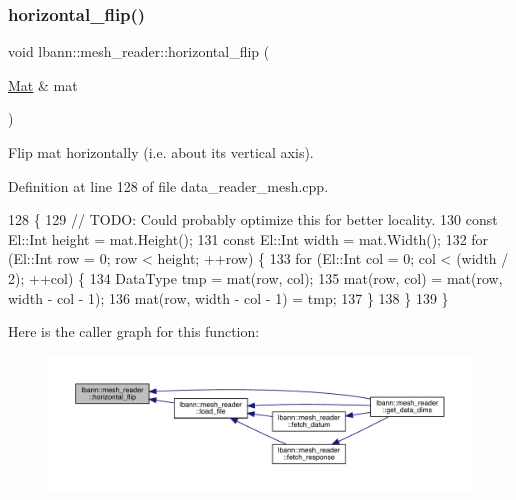 \subsubsection{\texorpdfstring{horizontal\+\_\+flip()}{horizontal\_flip()}}
{\footnotesize\ttfamily void lbann\+::mesh\+\_\+reader\+::horizontal\+\_\+flip (\begin{DoxyParamCaption}\item[{\hyperlink{base_8hpp_a68f11fdc31b62516cb310831bbe54d73}{Mat} \&}]{mat }\end{DoxyParamCaption})\hspace{0.3cm}{\ttfamily [protected]}}



Flip mat horizontally (i.\+e. about its vertical axis). 



Definition at line 128 of file data\+\_\+reader\+\_\+mesh.\+cpp.


\begin{DoxyCode}
128                                           \{
129   \textcolor{comment}{// TODO: Could probably optimize this for better locality.}
130   \textcolor{keyword}{const} El::Int height = mat.Height();
131   \textcolor{keyword}{const} El::Int width = mat.Width();
132   \textcolor{keywordflow}{for} (El::Int row = 0; row < height; ++row) \{
133     \textcolor{keywordflow}{for} (El::Int col = 0; col < (width / 2); ++col) \{
134       DataType tmp = mat(row, col);
135       mat(row, col) = mat(row, width - col - 1);
136       mat(row, width - col - 1) = tmp;
137     \}
138   \}
139 \}
\end{DoxyCode}
Here is the caller graph for this function\+:\nopagebreak
\begin{figure}[H]
\begin{center}
\leavevmode
\includegraphics[width=350pt]{classlbann_1_1mesh__reader_a8cff71603c2d652f8b000a5dc4c75431_icgraph}
\end{center}
\end{figure}
\mbox{\label{classlbann_1_1mesh__reader_a445c5a63f82da4d94905a205783dc377}} 
